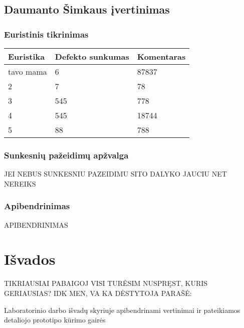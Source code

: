 \documentclass{VUMIFPSkursinis}
\begin{document}
\subsection{Daumanto Šimkaus įvertinimas}
\subsubsection{Euristinis tikrinimas}
\begin{center}
 \begin{tabular}{|| p{4cm} | p{4cm} | p{8cm} ||} 
 \hline
 Euristika & Defekto sunkumas & Komentaras \\
 \hline\hline
 tavo mama & 6 & 87837 \\ 
 \hline
 2 & 7 & 78 \\
 \hline
 3 & 545 & 778 \\
 \hline
 4 & 545 & 18744 \\
 \hline
 5 & 88 & 788 \\  %
 \hline                 %
\end{tabular}	
\end{center}

\subsubsection{Sunkesnių pažeidimų apžvalga}
JEI NEBUS SUNKESNIU PAZEIDIMU SITO DALYKO JAUCIU NET NEREIKS

\subsubsection{Apibendrinimas}
APIBENDRINIMAS


\section{Išvados}
TIKRIAUSIAI PABAIGOJ VISI TURĖSIM NUSPRĘST, KURIS GERIAUSIAS? IDK MEN, VA KA DĖSTYTOJA PARAŠĖ:

Laboratorinio darbo išvadų skyriuje apibendrinami vertinimai ir pateikiamos detaliojo prototipo kūrimo gairės


















\printbibliography[heading=bibintoc, title=Šaltiniai]  %
\end{document}
